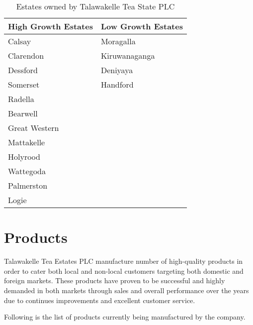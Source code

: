 \documentclass[12pt]{report}
\begin{document}
\begin{table}[H]
	\centering
	\begin{tabular}{ |p{5cm}|p{5cm}| }
		\hline
		\bf{High Growth Estates} & \bf{Low Growth Estates} \\
		\hline
		Calsay                   & Moragalla               \\
		Clarendon                & Kiruwanaganga           \\
		Dessford                 & Deniyaya                \\
		Somerset                 & Handford                \\
		Radella                  &                         \\
		Bearwell                 &                         \\
		Great Western            &                         \\
		Mattakelle               &                         \\
		Holyrood                 &                         \\
		Wattegoda                &                         \\
		Palmerston               &                         \\
		Logie                    &                         \\
		\hline
	\end{tabular}
	\caption{Estates owned by Talawakelle Tea State PLC}
\end{table}


\chapter{Products}
Talawakelle Tea Estates PLC manufacture number of high-quality products in order to cater both local and non-local customers targeting both domestic and foreign markets. These products have proven to be successful and highly demanded in both markets through sales and overall performance over the years due to continues improvements and excellent customer service.

\noindent
Following is the list of products currently being manufactured by the company.
\end{document}
